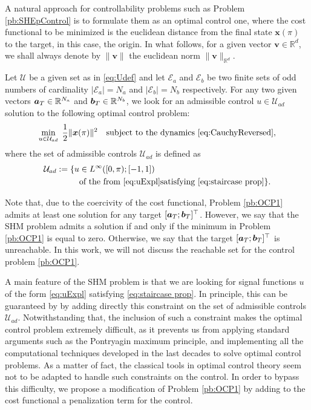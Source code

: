 \documentclass[twocolumn]{autart}    %
\begin{document}
A natural approach for controllability problems such as Problem \ref{pb:SHEpControl} is to formulate them as an optimal control one, where the cost functional to be minimized is the euclidean distance from the final state $\bm{x}(\pi)$ to the target, in this case, the origin. In what follows, for a given vector $\bm{v}\in\mathbb{R}^d$, we shall always denote by $\|\bm{v}\|$ the euclidean norm $\|\bm{v}\|_{\mathbb{R}^d}$.
\newline

\begin{problem}\label{pb:OCP1}
Let $\mathcal{U}$ be a given set as in \eqref{eq:Udef} and let $\mathcal{E}_a $ and $\mathcal{E} _b $ be two finite sets of odd numbers of cardinality $|\mathcal{E}_a| = N_a $ and $ |\mathcal{E} _b| = N_b$ respectively. For any two given vectors $\bm{a}_T \in \mathbb{R}^{N_a}$ and $\bm{b}_T \in \mathbb{R}^{N_b} $, we look for an admissible control $u\in \mathcal{U}_{ad}$ solution to the following optimal control problem:
\begin{equation*}
	\min_{u \in \mathcal{U}_{ad}}\;\frac 12 \|\bm{x}(\pi)\|^2 \quad \text{subject to the dynamics \eqref{eq:CauchyReversed}},
\end{equation*}
where the set of admissible controls $\mathcal{U}_{ad}$ is defined as
\begin{align*}
	\mathcal{U}_{ad} := \{ u&\in L^\infty ([0,\pi); [-1,1]) 
	\\ 
	&\text{of the from \eqref{eq:uExpl}} \text{satisfying \eqref{eq:staircase prop}} \}.
\end{align*}
\end{problem}

\begin{remark}
Note that, due to the coercivity of the cost functional, Problem \ref{pb:OCP1} admits at least one solution for any target $[\bm{a}_T;\bm{b}_T]^\top$. However, we say that the SHM problem admits a solution if and only if the minimum in Problem \ref{pb:OCP1} is equal to zero. Otherwise, we say that the target $[\bm{a}_T;\bm{b}_T]^\top$ is unreachable. In this work, we will not discuss the reachable set for the control problem \eqref{pb:OCP1}.
\end{remark}

A main feature of the SHM problem is that we are looking for signal functions $u$ of the form \eqref{eq:uExpl} satisfying \eqref{eq:staircase prop}. In principle, this can be guaranteed by by adding directly this constraint on the set of admissible controls $\mathcal{U}_{ad}$. Notwithstanding that, the inclusion of such a constraint makes the optimal control problem extremely difficult, as it prevents us from applying standard arguments such as the Pontryagin maximum principle, and implementing all the computational techniques developed in the last decades to solve optimal control problems. As a matter of fact, the classical tools in optimal control theory seem not to be adapted to handle such constraints on the control. In order to bypass this difficulty, we propose a modification of Problem \ref{pb:OCP1} by adding to the cost functional a penalization term for the control. 
\end{document}

